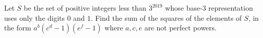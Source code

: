 Let $S$ be the set of positive integers less than $3^{2019}$ whose base-$3$ representation uses only the digits $0$ and $1$. Find the sum of the squares of the elements of $S$, in the form $a^b(c^d-1)(e^f-1)$ where $a,c,e$ are not perfect powers.
